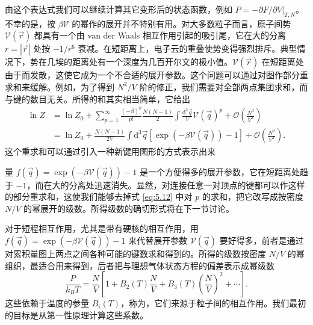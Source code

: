 由这个表达式我们可以继续计算其它变形后的状态函数，例如 $P=-\partial F/\partial V|_{T,N}$。不幸的是，按 $\beta\mathscr V$ 的幂作的展开并不特别有用。对大多数粒子而言，原子间势 $\mathscr V(\vec r)$ 都具有一个由 van der Waals 相互作用引起的吸引尾，它在大的分离 $r=|\vec r|$ 处按 $-1/r^6$ 衰减。在短距离上，电子云的重叠使势变得强烈排斥。典型情况下，势在几埃的距离处有一个深度为几百开尔文的极小值。$\mathscr V(\vec r)$ 在短距离处由于而发散，这使它成为一个不合适的展开参数。这个问题可以通过对图作部分重求和来缓解。例如，为了得到 $N^2/V$ 阶的修正，我们需要对全部两点集团求和，而与键的数目无关。所得的和其实相当简单，它给出
\begin{equation}\label{eq:5.14}
\begin{aligned}
\ln Z&=\ln Z_0+\sum_{p=1}^\infty\frac{(-\beta)^p}{p!}\frac{N(N-1)}{2}\int\frac{\mathrm{d}^3\vec q}{V}\mathscr V(\vec q)^p+\mathcal O\left(\frac{N^3}{V^2}\right)\\
&=\ln Z_0+\frac{N(N-1)}{2V}\int\mathrm{d}^3\vec q\left[\exp(-\beta\mathscr V(\vec q))-1\right]+\mathcal O\left(\frac{N^3}{V^2}\right).
\end{aligned}
\end{equation}
这个重求和可以通过引入一种新键用图形的方式表示出来

\begin{center}
\end{center}


量 $f(\vec q)=\exp(-\beta\mathscr V(\vec q))-1$ 是一个方便得多的展开参数，它在短距离处趋于 $-1$，而在大的分离处迅速消失。显然，对连接任意一对顶点的键都可以作这样的部分重求和，这使我们能够去掉式 \eqref{eq:5.12} 中对 $p$ 的求和，把它改写成按密度 $N/V$ 的幂展开的级数。所得级数的确切形式将在下一节讨论。



对于短程相互作用，尤其是带有硬核的相互作用，用 $f(\vec q)=\exp(-\beta\mathscr V(\vec q))-1$ 来代替展开参数 $\mathscr V(\vec q)$ 要好得多，前者是通过对累积量图上两点之间各种可能的键数求和得到的。所得的级数按密度 $N/V$ 的幂组织，最适合用来得到，后者把与理想气体状态方程的偏差表示成幂级数
\begin{equation}\label{eq:5.15}
\frac{P}{k_BT}=\frac NV\left[1+B_2(T)\frac NV+B_3(T)\left(\frac NV\right)^2+\cdots\right].
\end{equation}
这些依赖于温度的参量 $B_i(T)$，称为，它们来源于粒子间的相互作用。我们最初的目标是从第一性原理计算这些系数。

